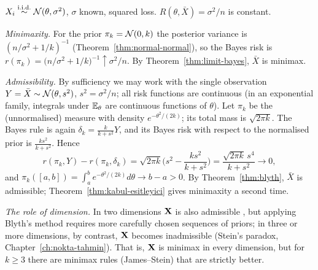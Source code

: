 \documentclass[main.tex]{subfiles}
\begin{document}
\begin{example}\label{ex:xbar-minimaks}
$X_i\overset{\text{i.i.d.}}{\sim}\mathcal{N}(\theta,\sigma^2)$, $\sigma$ known, squared loss. $R(\theta,\bar X)=\sigma^2/n$ is constant.

\emph{Minimaxity.} For the prior $\pi_k=\mathcal{N}(0,k)$ the posterior variance is $(n/\sigma^2+1/k)^{-1}$ (Theorem~\ref{thm:normal-normal}), so the Bayes risk is $r(\pi_k)=\big(n/\sigma^2+1/k\big)^{-1}\uparrow\sigma^2/n$. By Theorem~\ref{thm:limit-bayes}, $\bar X$ is minimax.

\emph{Admissibility.} By sufficiency we may work with the single observation $Y=\bar X\sim\mathcal{N}(\theta,s^2)$, $s^2=\sigma^2/n$; all risk functions are continuous (in an exponential family, integrals under $\mathbb{E}_\theta$ are continuous functions of $\theta$). Let $\pi_k$ be the (unnormalised) measure with density $e^{-\theta^2/(2k)}$; its total mass is $\sqrt{2\pi k}$. The Bayes rule is again $\delta_k=\frac{k}{k+s^2}Y$, and its Bayes risk with respect to the normalised prior is $\frac{ks^2}{k+s^2}$. Hence
\[
r(\pi_k,Y)-r(\pi_k,\delta_k)=\sqrt{2\pi k}\Big(s^2-\frac{ks^2}{k+s^2}\Big)=\frac{\sqrt{2\pi k}\,s^4}{k+s^2}\to0,
\]
and $\pi_k([a,b])=\int_a^be^{-\theta^2/(2k)}d\theta\to b-a>0$. By Theorem~\ref{thm:blyth}, $\bar X$ is admissible; Theorem~\ref{thm:kabul-esitleyici} gives minimaxity a second time.

\emph{The role of dimension.} In two dimensions $\mathbf{X}$ is also admissible \cite{stein56}, but applying Blyth's method requires more carefully chosen sequences of priors; in three or more dimensions, by contrast, $\mathbf{X}$ becomes inadmissible (Stein's paradox, Chapter~\ref{ch:nokta-tahmin}). That is, $\mathbf{X}$ is minimax in every dimension, but for $k\ge3$ there are minimax rules (James--Stein) that are strictly better.
\end{example}
\end{document}
